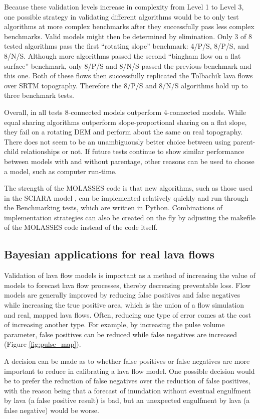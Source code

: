 	Because these validation levels increase in complexity from Level 1 to Level 3, one possible strategy in validating different algorithms would be to only test algorithms at more complex benchmarks after they successfully pass less complex benchmarks. Valid models might then be determined by elimination. Only 3 of 8 tested algorithms pass the first ``rotating slope'' benchmark: 4/P/S, 8/P/S, and 8/N/S. Although more algorithms passed the second ``bingham flow on a flat surface'' benchmark, only 8/P/S and 8/N/S passed the previous benchmark and this one. Both of these flows then successfully replicated the Tolbachik lava flows over SRTM topography. Therefore the 8/P/S and 8/N/S algorithms hold up to three benchmark tests.
	
	Overall, in all tests 8-connected models outperform 4-connected models. While equal sharing algorithms outperform slope-proportional sharing on a flat slope, they fail on a rotating DEM and perform about the same on real topography. There does not seem to be an unambiguously better choice between using parent-child relationships or not. If future tests continue to show similar performance between models with and without parentage, other reasons can be used to choose a model, such as computer run-time. 
	
	The strength of the MOLASSES code is that new algorithms, such as those used in the SCIARA model \citep{crisci2004simulation}, can be implemented relatively quickly and run through the Benchmarking tests, which are written in Python. Combinations of implementation strategies can also be created on the fly by adjusting the makefile of the MOLASSES code instead of the code itself.

	\subsection{Bayesian applications for real lava flows}
		Validation of lava flow models is important as a method of increasing the value of models to forecast lava flow processes, thereby decreasing preventable loss. Flow models are generally improved by reducing false positives and false negatives while increasing the true positive area, which is the union of a flow simulation and real, mapped lava flows. Often, reducing one type of error comes at the cost of increasing another type. For example, by increasing the pulse volume parameter, false positives can be reduced while false negatives are increased (Figure \ref{fig:pulse_map}).
		
		A decision can be made as to whether false positives or false negatives are more important to reduce in calibrating a lava flow model. One possible decision would be to prefer the reduction of false negatives over the reduction of false positives, with the reason being that a forecast of inundation without eventual engulfment by lava (a false positive result) is bad, but an unexpected engulfment by lava (a false negative) would be worse.
		
